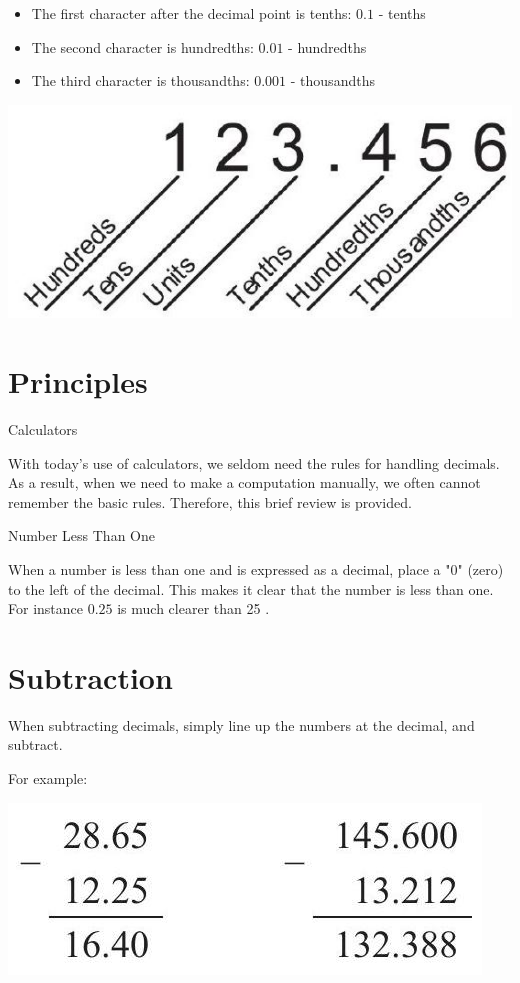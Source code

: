 \documentclass[10pt]{article}
\begin{document}
\begin{itemize}
  \item The first character after the decimal point is tenths: $0.1$ - tenths

  \item The second character is hundredths: $0.01$ - hundredths

  \item The third character is thousandths: $0.001$ - thousandths

\end{itemize}
\includegraphics[max width=\textwidth]{2022_09_11_72dbedc910e6e984560cg-10(1)}

\section{Principles}
Calculators

With today's use of calculators, we seldom need the rules for handling decimals. As a result, when we need to make a computation manually, we often cannot remember the basic rules. Therefore, this brief review is provided.

Number Less Than One

When a number is less than one and is expressed as a decimal, place a "0" (zero) to the left of the decimal. This makes it clear that the number is less than one. For instance $0.25$ is much clearer than 25 .

\section{Subtraction}
When subtracting decimals, simply line up the numbers at the decimal, and subtract.

For example:

\includegraphics[max width=\textwidth]{2022_09_11_72dbedc910e6e984560cg-11}
\end{document}
